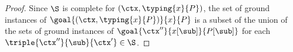 \begin{proof}
Since $\S$ is complete for $(\ctx, \typing{x}{P})$, the set of ground instances of $\goal{(\ctx, \typing{x}{P})}{x}{P}$ is a subset of the union of the sets of ground instances of $\goal{\ctx''}{x[\sub]}{P[\sub]}$ for each $\triple{\ctx''}{\sub}{\ctx'} \in \S$.
\end{proof}



